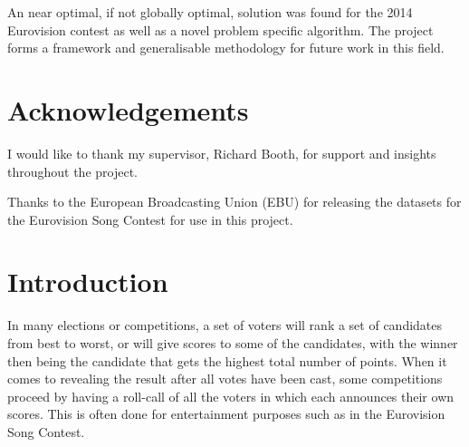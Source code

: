 \documentclass[12pt]{report}
\begin{document}
An near optimal, if not globally optimal, solution was found for the 2014 Eurovision contest as well as a novel problem specific algorithm.
The project forms a framework and generalisable methodology for future work in this field.

\section*{Acknowledgements}
I would like to thank my supervisor, Richard Booth, for support and insights throughout the project.

Thanks to the European Broadcasting Union (EBU) for releasing the datasets for the Eurovision Song Contest for use in this project.

\tableofcontents %
\listoffigures
\listoftables
\clearpage %

\section{Introduction}\label{Introduction}
In many elections or competitions, a set of voters will rank a set of candidates from best to worst, or will give scores to some of the candidates, with the winner then being the candidate that gets the highest total number of points. When it comes to revealing the result after all votes have been cast, some competitions proceed by having a roll-call of all the voters in which each announces their own scores. This is often done for entertainment purposes such as in the Eurovision Song Contest.\cite{EurovisionVoting}
\end{document}
